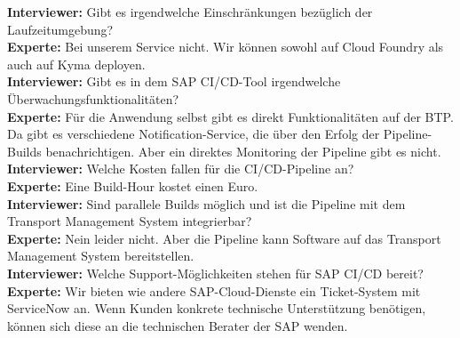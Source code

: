 \begin{linenumbers}
\textbf{Interviewer:} Gibt es irgendwelche Einschränkungen bezüglich der Laufzeitumgebung?\\
\textbf{Experte:} Bei unserem Service nicht. Wir können sowohl auf Cloud Foundry als auch auf Kyma deployen.\\
\textbf{Interviewer:} Gibt es in dem SAP CI/CD-Tool irgendwelche Überwachungsfunktionalitäten?\\ 
\textbf{Experte:} Für die Anwendung selbst gibt es direkt Funktionalitäten auf der BTP. Da gibt es verschiedene Notification-Service, die über den Erfolg der Pipeline-Builds benachrichtigen. Aber ein direktes Monitoring der Pipeline gibt es nicht.\\
\textbf{Interviewer:} Welche Kosten fallen für die CI/CD-Pipeline an?\\
\textbf{Experte:} Eine Build-Hour kostet einen Euro.\\
\textbf{Interviewer:} Sind parallele Builds möglich und ist die Pipeline mit dem Transport Management System integrierbar?\\
\textbf{Experte:} Nein leider nicht. Aber die Pipeline kann Software auf das Transport Management System bereitstellen.\\
\textbf{Interviewer:} Welche Support-Möglichkeiten stehen für SAP CI/CD bereit?\\
\textbf{Experte:} Wir bieten wie andere SAP-Cloud-Dienste ein Ticket-System mit ServiceNow an. Wenn Kunden konkrete technische Unterstützung benötigen, können sich diese an die technischen Berater der SAP wenden.\\
\end{linenumbers}
\newpage
\resetlinenumber
